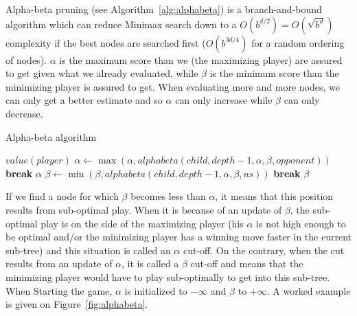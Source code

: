 Alpha-beta pruning (see Algorithm~\ref{alg:alphabeta}) is a branch-and-bound algorithm which can reduce Minimax search down to a $O(b^{d/2})=O(\sqrt{b^d})$ complexity if the best nodes are searched first ($O(b^{3d/4})$ for a random ordering of nodes). $\alpha$ is the maximum score than we (the maximizing player) are assured to get given what we already evaluated, while $\beta$ is the minimum score than the minimizing player is assured to get. When evaluating more and more nodes, we can only get a better estimate and so $\alpha$ can only increase while $\beta$ can only decrease. %
\begin{algorithm}
\caption{Alpha-beta algorithm}
\label{alg:alphabeta}
\begin{algorithmic}
        \State \Return $value(player)$
    \EndIf
            \State $\alpha \gets \max{(\alpha, alphabeta(child,depth-1,\alpha,\beta,opponent))}$
            \If{$\beta \leq \alpha$}
                \State \textbf{break}
            \EndIf
        \EndFor
        \State \Return $\alpha$
    \Else
            \State $\beta \gets \min{(\beta, alphabeta(child,depth-1,\alpha,\beta,us))}$
            \If{$\beta \leq \alpha$}
                \State \textbf{break}
            \EndIf
        \EndFor
        \State \Return $\beta$
    \EndIf
\EndFunction
\end{algorithmic}
\end{algorithm}
If we find a node for which $\beta$ becomes less than $\alpha$, it means that this position results from sub-optimal play. When it is because of an update of $\beta$, the sub-optimal play is on the side of the maximizing player (his $\alpha$ is not high enough to be optimal and/or the minimizing player has a winning move faster in the current sub-tree) and this situation is called an $\alpha$ cut-off. On the contrary, when the cut results from an update of $\alpha$, it is called a $\beta$ cut-off and means that the minimizing player would have to play sub-optimally to get into this sub-tree. When Starting the game, $\alpha$ is initialized to $-\infty$ and $\beta$ to $+\infty$. A worked example is given on Figure~\ref{fig:alphabeta}.
